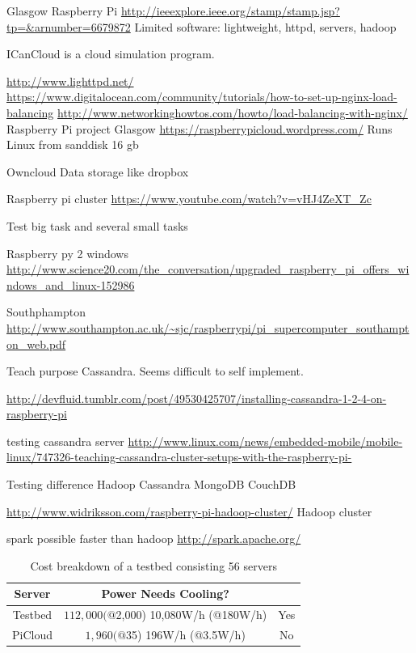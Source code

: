 \documentclass{sig-alternate-br}
\begin{document}
Glasgow Raspberry Pi
\url{http://ieeexplore.ieee.org/stamp/stamp.jsp?tp=&arnumber=6679872}
Limited software:
lightweight,
httpd,
servers, 
hadoop

ICanCloud is a cloud simulation program.


\url{http://www.lighttpd.net/}
\url{https://www.digitalocean.com/community/tutorials/how-to-set-up-nginx-load-balancing}
\url{http://www.networkinghowtos.com/howto/load-balancing-with-nginx/}
Raspberry Pi project Glasgow
\url{https://raspberrypicloud.wordpress.com/}
Runs Linux from sanddisk 16 gb

Owncloud
Data storage like dropbox

Raspberry pi cluster
\url{https://www.youtube.com/watch?v=vHJ4ZeXT_Zc}


Test big task and several small tasks

Raspberry py 2 windows
\url{http://www.science20.com/the_conversation/upgraded_raspberry_pi_offers_windows_and_linux-152986}

Southphampton
\url{http://www.southampton.ac.uk/~sjc/raspberrypi/pi_supercomputer_southampton_web.pdf}

Teach purpose Cassandra. Seems difficult to self implement.

\url{http://devfluid.tumblr.com/post/49530425707/installing-cassandra-1-2-4-on-raspberry-pi}

testing cassandra server
\url{http://www.linux.com/news/embedded-mobile/mobile-linux/747326-teaching-cassandra-cluster-setups-with-the-raspberry-pi-}


Testing difference
Hadoop
Cassandra
MongoDB
CouchDB


\url{http://www.widriksson.com/raspberry-pi-hadoop-cluster/}
Hadoop cluster

spark possible faster than hadoop
\url{http://spark.apache.org/}



\begin{table}
	\centering \caption{Cost breakdown of a testbed consisting 56 servers} 

\begin{tabular}{|c|c|c|} \hline
\textbf{Server}&  \textbf{Power} \textbf{Needs Cooling?} \\ \hline
Testbed  & $112,000 (@$2,000) 10,080W/h (@180W/h) & Yes \\ \hline
PiCloud & $1,960 (@$35) 196W/h (@3.5W/h) & No \\ \hline
\end{tabular}
\label{tab:cost}
\end{table}
\end{document}
